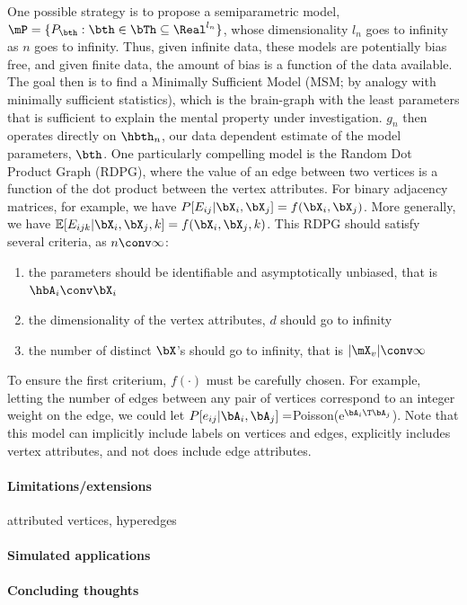 One possible strategy is to propose a semiparametric model, $\mP=\{P_{\bth} : \bth \in \bTh \subseteq \Real^{l_n}\}$, whose dimensionality $l_n$ goes to infinity as $n$ goes to infinity.  Thus, given infinite data, these models are potentially bias free, and given finite data, the amount of bias is a function of the data available.  The goal then is to find a Minimally Sufficient Model (MSM; by analogy with minimally sufficient statistics), which is the brain-graph with the least parameters that is sufficient to explain the mental property under investigation.  $g_n$ then operates directly on $\hbth_n$, our data dependent estimate of the model parameters, $\bth$.  One particularly compelling model is the Random Dot Product Graph (RDPG), where the value of an edge between two vertices is a function of the dot product between the vertex attributes.  For binary adjacency matrices, for example, we have $P[E_{ij} | \bX_i, \bX_j]=f(\bX_i, \bX_j)$.  More generally, we have $\mathbb{E}[E_{ijk} | \bX_i, \bX_j, k]= f(\bX_i, \bX_j, k)$.  This RDPG should satisfy several criteria, as $n \conv \infty$:

\begin{enumerate}
	\item the parameters should be identifiable and asymptotically unbiased, that is $\hbA_i \conv \bX_i$
	\item the dimensionality of the vertex attributes, $d$ should go to infinity
	\item the number of distinct $\bX$'s should go to infinity, that is $|\mX_v| \conv \infty$
\end{enumerate}

To ensure the first criterium, $f(\cdot)$ must be carefully chosen.  For example, letting the number of edges between any pair of vertices correspond to an integer weight on the edge, we could let $P[e_{ij} | \bA_i,\bA_j]=$Poisson(e$^{\bA_i\T \bA_j}$).  Note that this model can implicitly include labels on vertices and edges, explicitly includes vertex attributes, and not does include edge attributes.  


\paragraph{Limitations/extensions}

attributed vertices, hyperedges

\paragraph{Simulated applications}

\paragraph{Concluding thoughts}





